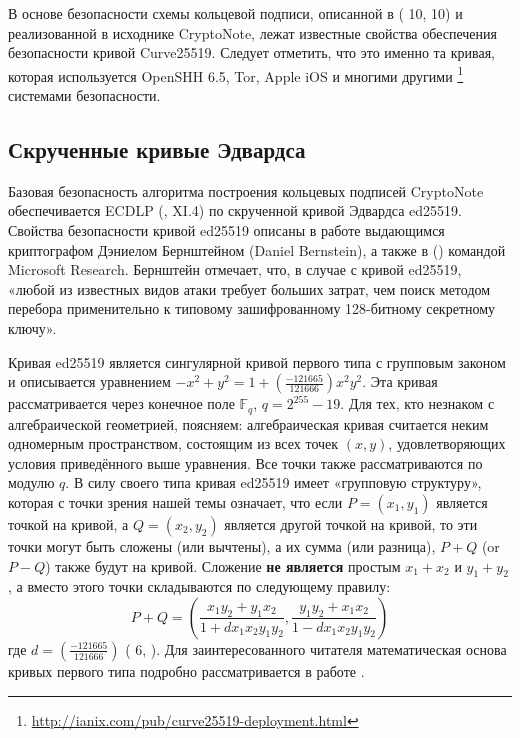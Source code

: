 \documentclass{mrl}
\numberwithin{equation}{section}
\numberwithin{figure}{section}
\begin{document}
В основе безопасности схемы кольцевой подписи, описанной в (\cite{FS} 10, \cite{CN} 10) и реализованной в исходнике CryptoNote, лежат известные свойства обеспечения безопасности кривой Curve25519. Следует отметить, что это именно та кривая, которая используется OpenSHH 6.5, Tor, Apple iOS и многими другими \footnote{\url{http://ianix.com/pub/curve25519-deployment.html}} системами безопасности.


\subsection{\label{sub:Twisted-Edwards-Curves}Скрученные кривые Эдвардса}

Базовая безопасность алгоритма построения кольцевых подписей CryptoNote обеспечивается ECDLP (\cite{Si}, XI.4) по скрученной кривой Эдвардса ed25519. Свойства безопасности кривой ed25519 описаны в работе \cite{Bern} выдающимся криптографом Дэниелом Бернштейном (Daniel Bernstein), а также в (\cite{BCPM}) командой Microsoft Research. Бернштейн отмечает, что, в случае с кривой ed25519, «любой из известных видов атаки требует больших затрат, чем поиск методом перебора применительно к типовому зашифрованному 128-битному секретному ключу».

Кривая ed25519 является сингулярной кривой первого типа с групповым законом и описывается уравнением $-x^{2}+y^{2}=1+\left(\frac{-121665}{121666}\right)x^{2}y^{2}$. Эта кривая рассматривается через конечное поле $\mathbb{F}_{q}$, $q=2^{255}-19$. Для тех, кто незнаком с алгебраической геометрией, поясняем: алгебраическая кривая считается неким одномерным пространством, состоящим из всех точек $\left(x,y\right)$, удовлетворяющих условия приведённого выше уравнения. Все точки также рассматриваются по модулю $q$. В силу своего типа кривая ed25519 имеет «групповую структуру», которая с точки зрения нашей темы означает, что если $P=\left(x_{1},y_{1}\right)$ является точкой на кривой, а $Q=\left(x_{2},y_{2}\right)$ является другой точкой на кривой, то эти точки могут быть сложены (или вычтены), а их сумма (или разница), $P+Q$ (or $P-Q$) также будут на кривой. Сложение \textbf{не является} простым $x_{1}+x_{2}$ и $y_{1}+y_{2}$, а вместо этого точки складываются по следующему правилу:
\[
P+Q=\left(\frac{x_{1}y_{2}+y_{1}x_{2}}{1+dx_{1}x_{2}y_{1}y_{2}},\frac{y_{1}y_{2}+x_{1}x_{2}}{1-dx_{1}x_{2}y_{1}y_{2}}\right)
\]
где $d=\left(\frac{-121665}{121666}\right)$ (\cite{BBJLP} 6,
\cite{BCPM}). Для заинтересованного читателя математическая основа кривых первого типа подробно рассматривается в работе \cite{Si}.
\end{document}
